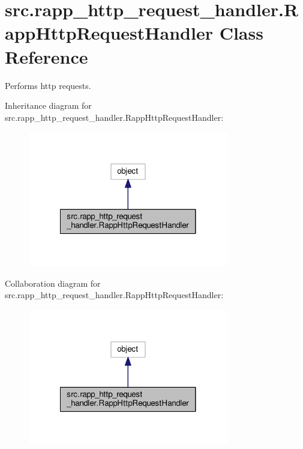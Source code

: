 \hypertarget{classsrc_1_1rapp__http__request__handler_1_1RappHttpRequestHandler}{\section{src.\-rapp\-\_\-http\-\_\-request\-\_\-handler.\-Rapp\-Http\-Request\-Handler Class Reference}
\label{classsrc_1_1rapp__http__request__handler_1_1RappHttpRequestHandler}
}


Performs http requests.  




Inheritance diagram for src.\-rapp\-\_\-http\-\_\-request\-\_\-handler.\-Rapp\-Http\-Request\-Handler\-:
\nopagebreak
\begin{figure}[H]
\begin{center}
\leavevmode
\includegraphics[width=248pt]{classsrc_1_1rapp__http__request__handler_1_1RappHttpRequestHandler__inherit__graph}
\end{center}
\end{figure}


Collaboration diagram for src.\-rapp\-\_\-http\-\_\-request\-\_\-handler.\-Rapp\-Http\-Request\-Handler\-:
\nopagebreak
\begin{figure}[H]
\begin{center}
\leavevmode
\includegraphics[width=248pt]{classsrc_1_1rapp__http__request__handler_1_1RappHttpRequestHandler__coll__graph}
\end{center}
\end{figure}

